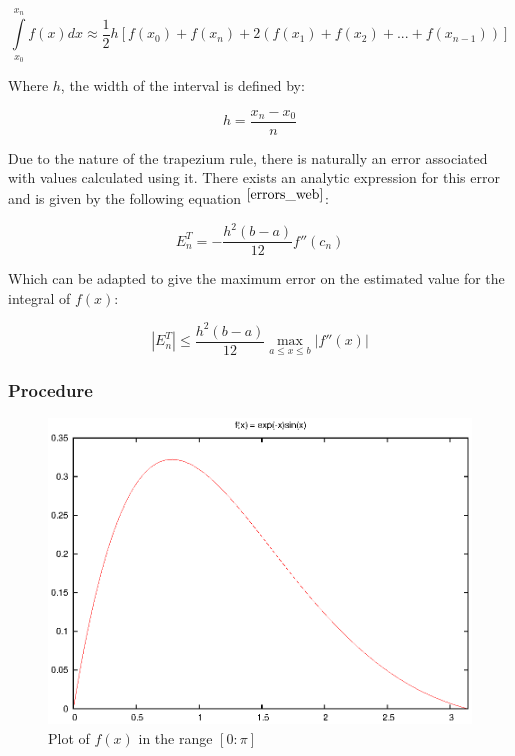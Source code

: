 \documentclass[pdf,color]{UoBnote}
\begin{document}
			\begin{equation} \label{eq:trapezium}
				\int\limits_{x_0}^{x_n} f(x) dx \approx \frac{1}{2}h\left[f(x_0) + f(x_n) + 2(f(x_1) + f(x_2) +...+ f(x_{n-1}))\right]
			\end{equation}
			
			Where $h$, the width of the interval is defined by:
			
			\begin{equation} \label{eq:h_def}
				h = \frac{x_n - x_0}{n}
			\end{equation}
			
			Due to the nature of the trapezium rule, there is naturally an error associated with values calculated using it.
			There exists an analytic expression for this error and is given by the following equation $^{\cite{errors_web}}$:
			
			
			\begin{equation} \label{eq:trap_err}
				E_n^T = -\frac{h^2\left(b-a\right)}{12}f''(c_n)
			\end{equation}
			
			Which can be adapted to give the maximum error on the estimated value for the integral of $f(x)$:
			
			\begin{equation} \label{eq:trap_err2}
				\left|E_n^T\right| \leq \frac{h^2\left(b-a\right)}{12}\max_{a \leq x \leq b}\left|f''(x)\right|
			\end{equation}
			
			\subsubsection{Procedure}
				
				\begin{figure}[tb]
					\centering
						\includegraphics{figures/q2b.eps}
					\caption{Plot of $f(x)$ in the range $[0:\pi]$}
					\label{fig:q2b}
				\end{figure}
				
\end{document}
